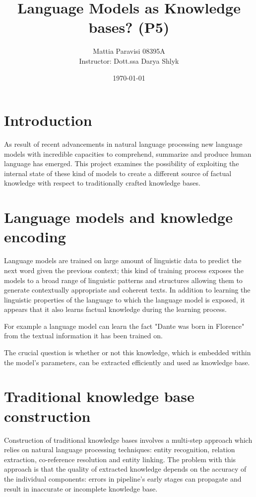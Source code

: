 \documentclass{article}
\title{Language Models as Knowledge bases? (P5)}
\author{Mattia Paravisi 08395A \\ Instructor: Dott.ssa Darya Shlyk}
\date{\today}
\begin{document}
\maketitle

\section{Introduction}
As result of recent advancements in natural language processing new language models with incredible capacities to comprehend, summarize and produce human language has emerged. This project examines the possibility of exploiting the internal state of these kind of models to create a different source of factual knowledge with respect to traditionally crafted knowledge bases.

\section{Language models and knowledge encoding}
Language models are trained on large amount of linguistic data to predict the next word given the previous context; this kind of training process exposes the models to a broad range of linguistic patterns and structures allowing them to generate contextually appropriate and coherent texts. In addition to learning the linguistic properties of the language to which the language model is exposed, it appears that it also learns factual knowledge during the learning process.

For example a language model can learn the fact "Dante was born in Florence" from the textual information it has been trained on.

The crucial question is whether or not this knowledge, which is embedded within the model's parameters, can be extracted efficiently and used as knowledge base.

\section{Traditional knowledge base construction}
Construction of traditional knowledge bases involves a multi-step approach which relies on natural language processing techniques: entity recognition, relation extraction, co-reference resolution and entity linking. The problem with this approach is that the quality of extracted knowledge depends on the accuracy of the individual components: errors in pipeline's early stages can propagate and result in inaccurate or incomplete knowledge base.
\end{document}
